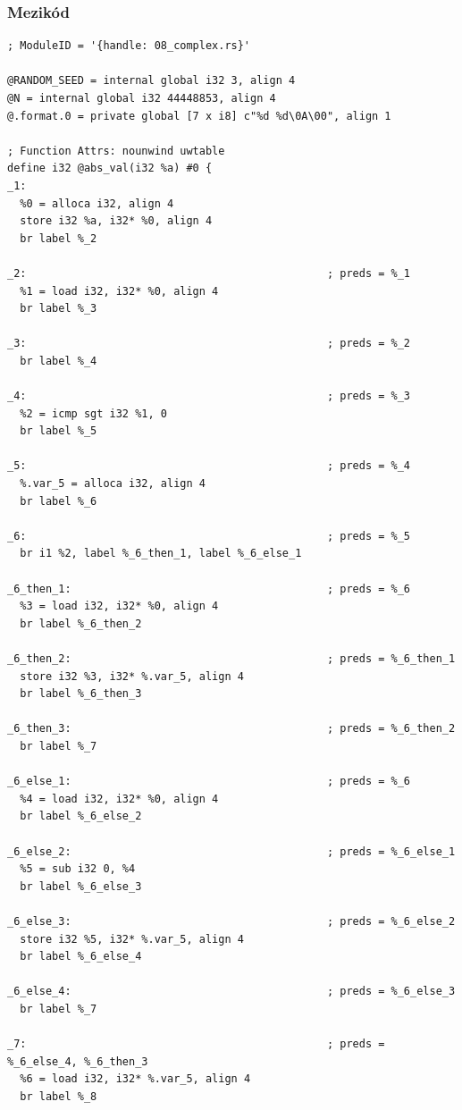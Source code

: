 \documentclass[12pt,a4paper]{article}
\begin{document}
\subsubsection{Mezikód}

\begin{verbatim}
; ModuleID = '{handle: 08_complex.rs}'

@RANDOM_SEED = internal global i32 3, align 4
@N = internal global i32 44448853, align 4
@.format.0 = private global [7 x i8] c"%d %d\0A\00", align 1

; Function Attrs: nounwind uwtable
define i32 @abs_val(i32 %a) #0 {
_1:
  %0 = alloca i32, align 4
  store i32 %a, i32* %0, align 4
  br label %_2

_2:                                               ; preds = %_1
  %1 = load i32, i32* %0, align 4
  br label %_3

_3:                                               ; preds = %_2
  br label %_4

_4:                                               ; preds = %_3
  %2 = icmp sgt i32 %1, 0
  br label %_5

_5:                                               ; preds = %_4
  %.var_5 = alloca i32, align 4
  br label %_6

_6:                                               ; preds = %_5
  br i1 %2, label %_6_then_1, label %_6_else_1

_6_then_1:                                        ; preds = %_6
  %3 = load i32, i32* %0, align 4
  br label %_6_then_2

_6_then_2:                                        ; preds = %_6_then_1
  store i32 %3, i32* %.var_5, align 4
  br label %_6_then_3

_6_then_3:                                        ; preds = %_6_then_2
  br label %_7

_6_else_1:                                        ; preds = %_6
  %4 = load i32, i32* %0, align 4
  br label %_6_else_2

_6_else_2:                                        ; preds = %_6_else_1
  %5 = sub i32 0, %4
  br label %_6_else_3

_6_else_3:                                        ; preds = %_6_else_2
  store i32 %5, i32* %.var_5, align 4
  br label %_6_else_4

_6_else_4:                                        ; preds = %_6_else_3
  br label %_7

_7:                                               ; preds = %_6_else_4, %_6_then_3
  %6 = load i32, i32* %.var_5, align 4
  br label %_8


\end{verbatim}
\end{document}
